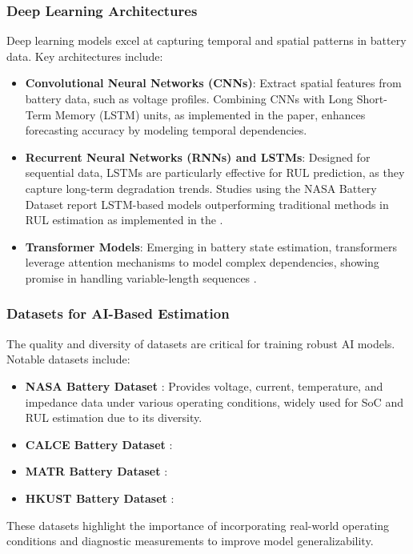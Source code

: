 \subsubsection{Deep Learning Architectures}
Deep learning models excel at capturing temporal and spatial patterns in battery data. Key architectures include:
\begin{itemize}
    \item \textbf{Convolutional Neural Networks (CNNs)}: Extract spatial features from battery data, such as voltage profiles. Combining CNNs with Long Short-Term Memory (LSTM) units, as implemented in the \cite{Fangfang_Yang} paper, enhances forecasting accuracy by modeling temporal dependencies.
    \item \textbf{Recurrent Neural Networks (RNNs) and LSTMs}: Designed for sequential data, LSTMs are particularly effective for RUL prediction, as they capture long-term degradation trends. Studies using the NASA Battery Dataset \cite{noauthor_nasa_nodate} report LSTM-based models outperforming traditional methods in RUL estimation as implemented in the \cite{hong_state--health_2023}.
    \item \textbf{Transformer Models}: Emerging in battery state estimation, transformers leverage attention mechanisms to model complex dependencies, showing promise in handling variable-length sequences \cite{yilmaz_transformer-based_2025}.
\end{itemize}

\subsubsection{Datasets for AI-Based Estimation}
The quality and diversity of datasets are critical for training robust AI models. Notable datasets include:
\begin{itemize}
    \item \textbf{NASA Battery Dataset} \cite{noauthor_nasa_nodate}: Provides voltage, current, temperature, and impedance data under various operating conditions, widely used for SoC and RUL estimation due to its diversity.
    \item \textbf{CALCE Battery Dataset} \cite{CALCE_battery_nodate}:
    \item \textbf{MATR Battery Dataset} \cite{MATR_dataset_nodate}: 
    \item \textbf{HKUST Battery Dataset} \cite{pepe_hkust_nodate}: 
\end{itemize}
These datasets highlight the importance of incorporating real-world operating conditions and diagnostic measurements to improve model generalizability.


